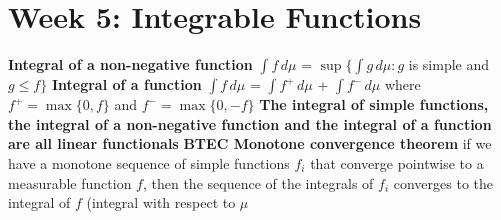 \documentclass{article}
\begin{document}
\section{Week 5: Integrable Functions}
\textbf{Integral of a non-negative function} $\int f \,d\mu$ = $\sup\{ \int g \,d\mu : g$ is simple and $g \leq f \}$
\newline \newline \textbf{Integral of a function} $\int f \,d\mu$ = $\int f^{+} \,d\mu$ + $\int f^{-} \,d\mu$ where $f^{+} = \max\{0, f\}$ and $f^{-} = \max\{0, -f\}$
\newline \newline \textbf{The integral of simple functions, the integral of a non-negative function and the integral of a function are all linear functionals}
\newline \newline \textbf{BTEC Monotone convergence theorem} if we have a monotone sequence of simple functions $f_i$ that converge pointwise to a measurable function $f$, then the sequence of the integrals of $f_i$ converges to the integral of $f$ (integral with respect to $\mu$
\end{document}
